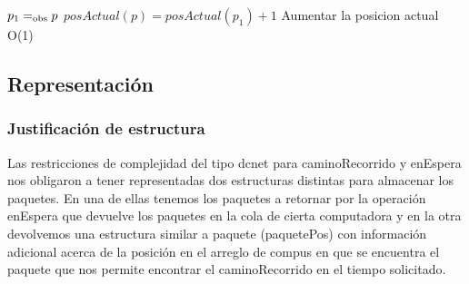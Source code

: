  {$p_1 =_{\mathrm{obs}} p$}
 {$posActual(p) = posActual(p_1) + 1$}
 {Aumentar la posicion actual}
 {O(1)}
 {}
  
\subsection{Representación}


\subsubsection*{Justificación de estructura}{
	Las restricciones de complejidad del tipo dcnet para caminoRecorrido y enEspera nos obligaron a tener representadas dos estructuras
	distintas para almacenar los paquetes. En una de ellas tenemos los paquetes a retornar por la operación enEspera que devuelve los 
	paquetes en la cola de cierta computadora y en la otra devolvemos una estructura similar a paquete (paquetePos) con información
	adicional acerca de la posición en el arreglo de compus en que se encuentra el paquete que nos permite encontrar el caminoRecorrido 
	en el tiempo solicitado.
}
